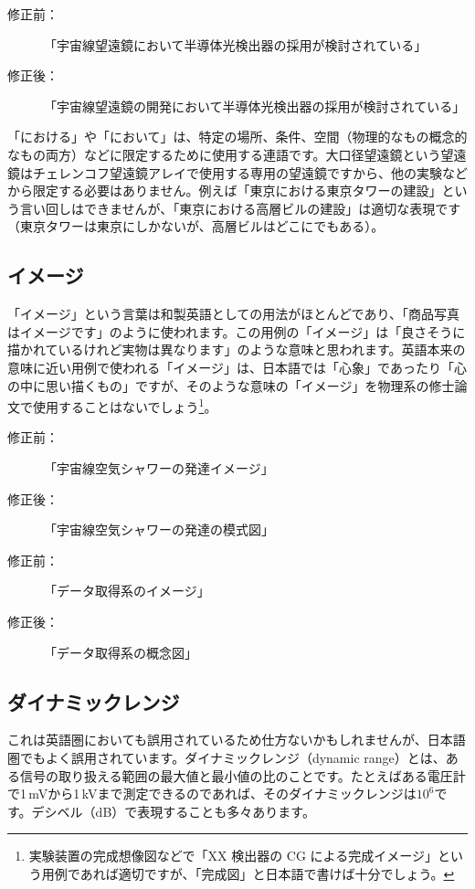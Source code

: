 \begin{description}
\item[修正前：]「宇宙線望遠鏡において半導体光検出器の採用が検討されている」
\item[修正後：]「宇宙線望遠鏡の開発において半導体光検出器の採用が検討されている」
\end{description}

「における」や「において」は、特定の場所、条件、空間（物理的なもの概念的なもの両方）などに限定するために使用する連語です。大口径望遠鏡という望遠鏡はチェレンコフ望遠鏡アレイで使用する専用の望遠鏡ですから、他の実験などから限定する必要はありません。例えば「東京における東京タワーの建設」という言い回しはできませんが、「東京における高層ビルの建設」は適切な表現です（東京タワーは東京にしかないが、高層ビルはどこにでもある）。

\subsection{イメージ}

「イメージ」という言葉は和製英語としての用法がほとんどであり、「商品写真はイメージです」のように使われます。この用例の「イメージ」は「良さそうに描かれているけれど実物は異なります」のような意味と思われます。英語本来の意味に近い用例で使われる「イメージ」は、日本語では「心象」であったり「心の中に思い描くもの」ですが、そのような意味の「イメージ」を物理系の修士論文で使用することはないでしょう\footnote{実験装置の完成想像図などで「XX 検出器の CG による完成イメージ」という用例であれば適切ですが、「完成図」と日本語で書けば十分でしょう。}。

\begin{description}
\item[修正前：]「宇宙線空気シャワーの発達イメージ」
\item[修正後：]「宇宙線空気シャワーの発達の模式図」
\end{description}

\begin{description}
\item[修正前：]「データ取得系のイメージ」
\item[修正後：]「データ取得系の概念図」
\end{description}

\subsection{ダイナミックレンジ}

これは英語圏においても誤用されているため仕方ないかもしれませんが、日本語圏でもよく誤用されています。ダイナミックレンジ（dynamic range）とは、ある信号の取り扱える範囲の最大値と最小値の比のことです。たとえばある電圧計で1\,mVから1\,kVまで測定できるのであれば、そのダイナミックレンジは$10^6$です。デシベル（dB）で表現することも多々あります。

